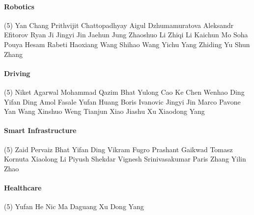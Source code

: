 \vspace{-0.32\baselineskip}\paragraph{\footnotesize Robotics} \mbox{}
\vspace{-0.32\baselineskip}
\begingroup
\footnotesize
\begin{tasks}[label=\relax, label-width=0pt, item-indent=4pt](5)
\task Yan Chang 
\task Prithvijit Chattopadhyay 
\task Aigul Dzhumamuratova 
\task Aleksandr Efitorov 
\task Ryan Ji 
\task Jingyi Jin 
\task Jaehun Jung 
\task Zhaoshuo Li 
\task Zhiqi Li 
\task Kaichun Mo 
\task Soha Pouya 
\task Hesam Rabeti 
\task Haoxiang Wang 
\task Shihao Wang 
\task Yichu Yang 
\task Zhiding Yu 
\task Shun Zhang 
\end{tasks}
\endgroup

\vspace{-0.32\baselineskip}\paragraph{\footnotesize Driving} \mbox{}
\vspace{-0.32\baselineskip}
\begingroup
\footnotesize
\begin{tasks}[label=\relax, label-width=0pt, item-indent=4pt](5)
\task Niket Agarwal 
\task Mohammad Qazim Bhat 
\task Yulong Cao 
\task Ke Chen 
\task Wenhao Ding 
\task Yifan Ding 
\task Amol Fasale 
\task Yufan Huang 
\task Boris Ivanovic 
\task Jingyi Jin 
\task Marco Pavone 
\task Yan Wang 
\task Xinshuo Weng 
\task Tianjun Xiao 
\task Jiashu Xu 
\task Xiaodong Yang 
\end{tasks}
\endgroup

\vspace{-0.32\baselineskip}\paragraph{\footnotesize Smart Infrastructure} \mbox{}
\vspace{-0.32\baselineskip}
\begingroup
\footnotesize
\begin{tasks}[label=\relax, label-width=0pt, item-indent=4pt](5)
\task Zaid Pervaiz Bhat 
\task Yifan Ding 
\task Vikram Fugro 
\task Prashant Gaikwad 
\task Tomasz Kornuta 
\task Xiaolong Li 
\task Piyush Shekdar 
\task Vignesh Srinivasakumar 
\task Paris Zhang 
\task Yilin Zhao 
\end{tasks}
\endgroup

\vspace{-0.32\baselineskip}\paragraph{\footnotesize Healthcare} \mbox{}
\vspace{-0.32\baselineskip}
\begingroup
\footnotesize
\begin{tasks}[label=\relax, label-width=0pt, item-indent=4pt](5)
\task Yufan He
\task Nic Ma
\task Daguang Xu
\task Dong Yang
\end{tasks}
\endgroup

